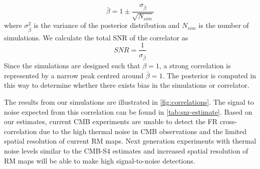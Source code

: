 \documentclass[usenatbib,hidelinks]{mnras}
\begin{document}
{\begin{equation}
\bar{\beta} = 1 \pm \frac{\sigma_{\bar{\beta}}}{\sqrt{N_{sim}}}
\end{equation}
where $\sigma_{\bar{\beta}}^{2}$ is the variance of the posterior distribution and $N_{sim}$ is the number of simulations.
We calculate the total SNR of the correlator as
\begin{equation}
SNR = \frac{1}{\sigma_{\bar{\beta}} }  \label{eqn:snr-1}
\end{equation}
 Since the simulations are designed such that $\beta =1$, a strong correlation is represented by a narrow peak centred around $\bar{\beta}=1$.  The posterior is computed in this way to determine whether there exists bias in the simulations or correlator.

The results from our simulations are illustrated in \autoref{fig:correlations}.
The signal to noise expected from this correlation can be found in \autoref{tab:snr-estimate}.
Based on our estimates, current CMB experiments are unable to detect the FR cross-correlation due to the high thermal noise in CMB observations and the limited spatial resolution of current RM maps.
 Next generation experiments with thermal noise levels similar to the CMB-S4 estimates and increased spatial resolution of RM maps will be able to make high signal-to-noise detections.
 }
\end{document}
